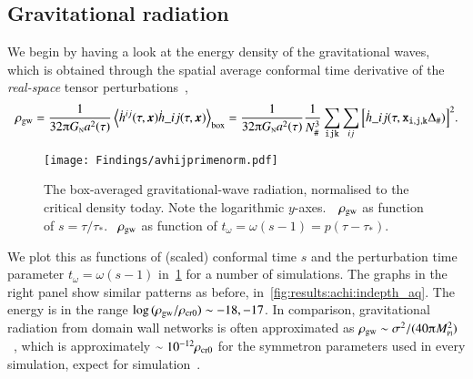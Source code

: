 \subsection{Gravitational radiation}\label{sec:results:h11:rho_gw}
    We begin by having a look at the energy density of the gravitational waves, which is obtained through the spatial average conformal time derivative of the \emph{real-space} tensor perturbations~\citep{kawasakiStudyGravitationalRadiation2011},
    \begin{equation}\label{eq:results:h11:rho_gw}
        \rho\ped{gw} = \frac{1}{32\ppi G\nped{N}a^2(\tau)} \left\langle \dot{h}\^{ij}(\tau, \vec{x})\dot{h}\_{ij}(\tau, \vec{x}) \right\rangle_{\mathrm{box}} =  \frac{1}{32\ppi G\nped{N}a^2(\tau)} \frac{1}{N_\#^3} \sum_{\lcoord{i}\lcoord{j}\lcoord{k}} \sum_{ij} \bclosed{\dot{h}\_{ij}(\tau,\lcoord{x}_{\lcoord{i}, \lcoord{j}, \lcoord{k}} \Delta_\# )}^2.
    \end{equation}
    \begin{figure}[ht]
        \centering
        \texttt{[image: Findings/avhijprimenorm.pdf]}
        \caption{The box-averaged gravitational-wave radiation, normalised to the critical density today. Note the logarithmic $y$-axes.~~$\rho_\mathrm{gw}$ as function of $s=\tau/\tau_\ast$. ~$\rho_\mathrm{gw}$ as function of $t_\omega = \omega(s-1)= p(\tau-\tau_\ast)$.}
        \label{fig:results:h11:avhijprimenorm}
    \end{figure}
    We plot this as functions of (scaled) conformal time $s$ and the perturbation time parameter $t_\omega = \omega(s-1)$ in~\cref{fig:results:h11:avhijprimenorm} for a number of simulations. %
    The graphs in the right panel show similar patterns as before, in~\cref{fig:results:achi:indepth_aq}. %
    The energy is in the range $\log{(\rho\ensuremath{_\mathrm{gw}}/\rho\ensuremath{_\mathrm{cr0}})}\sim-18, -17$. In comparison, gravitational radiation from domain wall networks is often approximated as $\rho\ped{gw}\sim \sigma^2 /(40\ppi M\nped{Pl}^2)$~\citep{ramazanovFreezeinDarkMatter2022}, which is approximately $ \sim 10^{-12}\rho_\mathrm{cr0}$ for the symmetron parameters used in every simulation, expect for simulation~.
    
    


